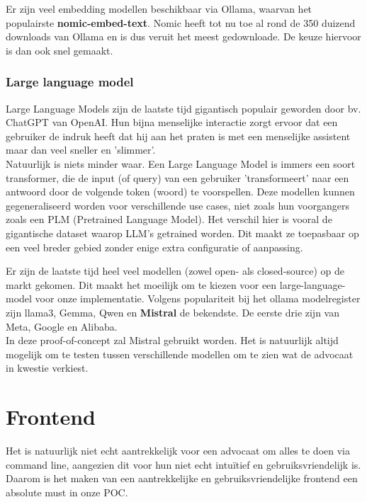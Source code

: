 Er zijn veel embedding modellen beschikbaar via Ollama, waarvan het populairste \textbf{nomic-embed-text}. 
Nomic heeft tot nu toe al rond de 350 duizend downloads van Ollama en is dus veruit het meest gedownloade. 
De keuze hiervoor is dan ook snel gemaakt. 

\subsubsection{Large language model}
Large Language Models zijn de laatste tijd gigantisch populair geworden door bv. ChatGPT van OpenAI.
Hun bijna menselijke interactie zorgt ervoor dat een gebruiker de indruk heeft dat hij aan het praten is met een menselijke assistent maar dan veel sneller en 'slimmer'.\\

Natuurlijk is niets minder waar.
Een Large Language Model is immers een soort transformer, die de input (of query) van een gebruiker 'transformeert' naar een antwoord door de volgende token (woord) te voorspellen.
Deze modellen kunnen gegeneraliseerd worden voor verschillende use cases, niet zoals hun voorgangers zoals een PLM (Pretrained Language Model).
Het verschil hier is vooral de gigantische dataset waarop LLM's getrained worden.
Dit maakt ze toepasbaar op een veel breder gebied zonder enige extra configuratie of aanpassing.

Er zijn de laatste tijd heel veel modellen (zowel open- als closed-source) op de markt gekomen. Dit maakt het moeilijk om te kiezen voor een large-language-model voor onze implementatie. 
Volgens populariteit bij het ollama modelregister zijn llama3, Gemma, Qwen en \textbf{Mistral} de bekendste. De eerste drie zijn van Meta, Google en Alibaba. \\

In deze proof-of-concept zal Mistral gebruikt worden. Het is natuurlijk altijd mogelijk om te testen tussen verschillende modellen om te zien wat de advocaat in kwestie verkiest. 

\section{Frontend}
Het is natuurlijk niet echt aantrekkelijk voor een advocaat om alles te doen via command line, aangezien dit voor hun niet echt intuïtief en gebruiksvriendelijk is. 
Daarom is het maken van een aantrekkelijke en gebruiksvriendelijke frontend een absolute must in onze POC. \\ 


